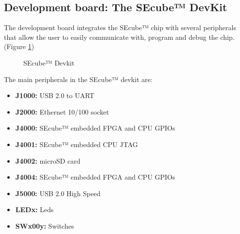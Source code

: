 \subsection{Development board: The SEcube™ DevKit}

The development board integrates the SEcube™ chip with several peripherals that allow the user to easily communicate with, program and debug the chip. (Figure \ref{fig:devboard})

\begin{figure}[ht]
  \centering
  \caption{SEcube™ Devkit}
 \label{fig:devboard}
\end{figure}

The main peripherals in the SEcube™ devkit are:

\begin{itemize}
\setlength\itemsep{-3pt}
\item \textbf{J1000: }\tabto{2.3cm} USB 2.0 to UART 
\item \textbf{J2000: }\tabto{2.3cm} Ethernet 10/100 socket 
\item \textbf{J4000: }\tabto{2.3cm} SEcube™ embedded FPGA and CPU GPIOs
\item \textbf{J4001: }\tabto{2.3cm} SEcube™ embedded CPU JTAG
\item \textbf{J4002: }\tabto{2.3cm} microSD card 
\item \textbf{J4004: }\tabto{2.3cm} SEcube™ embedded FPGA and CPU GPIOs
\item \textbf{J5000: }\tabto{2.3cm} USB 2.0 High Speed 
\item \textbf{LEDx:  }\tabto{2.3cm} Leds 
\item \textbf{SWx00y:}\tabto{2.3cm} Switches 
\end{itemize}

